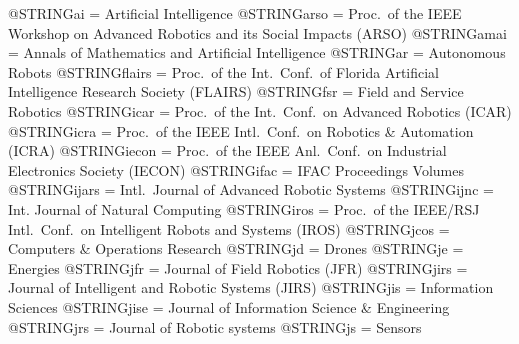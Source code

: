 \iffalse

\usepackage{pgfplots}		%
\pgfplotsset{compat=1.13}
\usepackage{tikz}
\usetikzlibrary{external,positioning,calc,decorations.markings,arrows,shapes,patterns}
\fi

\iffalse


@STRING{ai      = {Artificial Intelligence} }
@STRING{arso	= {Proc.~of the IEEE Workshop on Advanced Robotics and its Social Impacts (ARSO)} }
@STRING{amai	= {Annals of Mathematics and Artificial Intelligence} }
@STRING{ar      = {Autonomous Robots} }
@STRING{flairs 	= {Proc.~of the Int.~Conf.~of Florida Artificial Intelligence Research Society (FLAIRS)} }
@STRING{fsr		= {Field and Service Robotics} }
@STRING{icar    = {Proc.~of the Int.~Conf.~on Advanced Robotics (ICAR)} }
@STRING{icra    = {Proc.~of the IEEE Intl.~Conf.~on Robotics \& Automation (ICRA)} }
@STRING{iecon   = {Proc.~of the IEEE Anl.~Conf.~on Industrial Electronics Society (IECON)} }
@STRING{ifac    = {IFAC Proceedings Volumes} }
@STRING{ijars   = {Intl.~Journal of Advanced Robotic Systems} }
@STRING{ijnc	= {Int. Journal of Natural Computing} }
@STRING{iros    = {Proc.~of the IEEE/RSJ Intl.~Conf.~on Intelligent Robots and Systems (IROS)} }
@STRING{jcos    = {Computers \& Operations Research} }
@STRING{jd		= {Drones} }
@STRING{je		= {Energies} }
@STRING{jfr     = {Journal of Field Robotics (JFR)} }
@STRING{jirs    = {Journal of Intelligent and Robotic Systems (JIRS)} }
@STRING{jis		= {Information Sciences} }
@STRING{jise    = {Journal of Information Science \& Engineering} }
@STRING{jrs		= {Journal of Robotic systems} }
@STRING{js		= {Sensors} }

